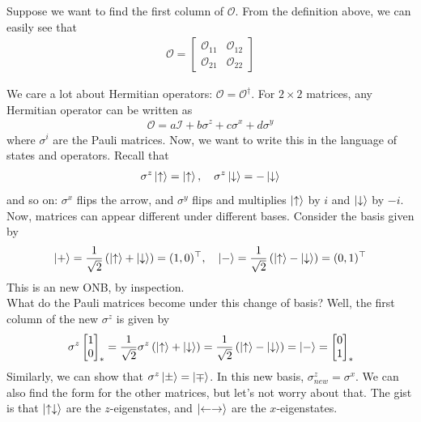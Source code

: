 \documentclass{book}
\theoremstyle{definition}
\newcommand{\f}[2]{\frac{#1}{#2}}
\newcommand{\lp}{\left(}
\newcommand{\rp}{\right)}
\newcommand{\Id}{\mathcal{I}}
\begin{document}
Suppose we want to find the first column of $\mathcal{O}$. From the definition above, we can easily see that
\begin{align}
\mathcal{O} = \begin{bmatrix}
\mathcal{O}_{11} & \mathcal{O}_{12} \\ \mathcal{O}_{21} & \mathcal{O}_{22}
\end{bmatrix}
\end{align}


We care a lot about Hermitian operators: $\mathcal{O} = \mathcal{O}^\dagger$. For $2\times 2$ matrices, any Hermitian operator can be written as 
\begin{align}
\mathcal{O} = a\Id + b\sigma^z + c\sigma^x + d\sigma^y
\end{align}
where $\sigma^i$ are the Pauli matrices. Now, we want to write this in the language of states and operators. Recall that 
\begin{align}
\sigma^z\ket{\uparrow} = \ket{\uparrow}, \quad \sigma^z\ket{\downarrow} = -\ket{\downarrow}
\end{align}
and so on: $\sigma^x$ flips the arrow, and $\sigma^y$ flips and multiplies $\ket{\uparrow}$ by $i$ and $\ket{\downarrow}$ by $-i$. \\

Now, matrices can appear different under different bases. Consider the basis given by
\begin{align}
\ket{+} = \f{1}{\sqrt{2}}\lp \ket{\uparrow} + \ket{\downarrow} \rp = (1,0)^\top, \quad
\ket{-} = \f{1}{\sqrt{2}}\lp \ket{\uparrow} - \ket{\downarrow} \rp = (0,1)^\top
\end{align}
This is an new ONB, by inspection. \\
 
What do the Pauli matrices become under this change of basis? Well, the first column of the new $\sigma^z$ is given by
\begin{align}
\sigma^z\begin{bmatrix}
1\\0
\end{bmatrix}_* = \f{1}{\sqrt{2}} \sigma^z \lp \ket{\uparrow} +  \ket{\downarrow} \rp = \f{1}{\sqrt{2}}\lp \ket{\uparrow} - \ket{\downarrow} \rp  =\ket{-} = \begin{bmatrix}
0\\1
\end{bmatrix}_*
\end{align}
Similarly, we can show that $\sigma^z\ket{\pm} = \ket{\mp}$. In this new basis, $\sigma^z_{new} = \sigma^x$. We can also find the form for the other matrices, but let's not worry about that. The gist is that $\ket{\uparrow\downarrow}$ are the $z$-eigenstates, and $\ket{\leftarrow\rightarrow}$ are the $x$-eigenstates. \\
\end{document}
